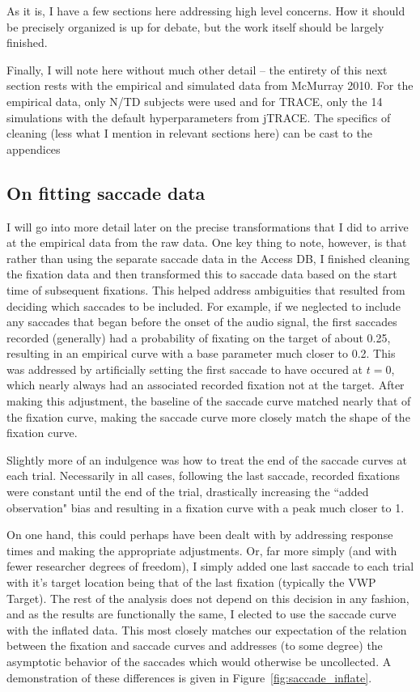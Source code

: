 \documentclass{article}
\begin{document}
As it is, I have a few sections here addressing high level concerns. How it should be precisely organized is up for debate, but the work itself should be largely finished.

Finally, I will note here without much other detail -- the entirety of this next section rests with the empirical and simulated data from McMurray 2010. For the empirical data, only N/TD subjects were used and for TRACE, only the 14 simulations with the default hyperparameters from jTRACE. The specifics of cleaning (less what I mention in relevant sections here) can be cast to the appendices

\subsection{On fitting saccade data}


I will go into more detail later on the precise transformations that I did to arrive at the empirical data from the raw data.  One key thing to note, however, is that rather than using the separate saccade data in the Access DB, I finished cleaning the fixation data and then transformed this to saccade data based on the start time of subsequent fixations. This helped address ambiguities that resulted from deciding which saccades to be included. For example, if we neglected to include any saccades that began before the onset of the audio signal, the first saccades recorded (generally) had a probability of fixating on the target of about 0.25, resulting in an empirical curve with a base parameter much closer to 0.2. This was addressed by artificially setting the first saccade to have occured at $t = 0$, which nearly always had an associated recorded fixation not at the target. After making this adjustment, the baseline of the saccade  curve matched nearly that of the fixation curve, making the saccade curve more closely match the shape of the fixation curve.

Slightly more of an indulgence was how to treat the end of the saccade curves at each trial. Necessarily in all cases, following the last saccade, recorded fixations were constant until the end of the trial, drastically increasing the ``added observation" bias and resulting in a fixation curve with a peak much closer to 1.

On one hand, this could perhaps have been dealt with by addressing response times and making the appropriate adjustments. Or, far more simply (and with fewer researcher degrees of freedom), I simply added one last saccade to each trial with it's target location being that of the last fixation (typically the VWP Target). The rest of the analysis does not depend on this decision in any fashion, and as the results are functionally the same, I elected to use the saccade curve with the inflated data. This most closely matches our expectation of the relation between the fixation and saccade curves and addresses (to some degree) the asymptotic behavior of the saccades which would otherwise be uncollected. A demonstration of these differences is given in Figure~\ref{fig:saccade_inflate}.
\end{document}
